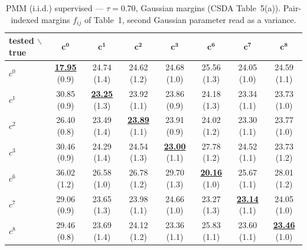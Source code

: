 \begin{table}[htbp]
  \centering
  \small
  \setlength{\tabcolsep}{4pt}
  \caption{PMM (i.i.d.) supervised — $\tau = 0.70$, Gaussian margins (CSDA Table~5(a)). Pair-indexed margins $f_{ij}$ of Table~1, second Gaussian parameter read as a variance.}
  \label{tab:exp2-high_tau_gauss}
  \begin{tabular}{lccccccc}
    \toprule
    tested $\backslash$ true & $\mathbf{c^{0}}$ & $\mathbf{c^{1}}$ & $\mathbf{c^{2}}$ & $\mathbf{c^{3}}$ & $\mathbf{c^{6}}$ & $\mathbf{c^{7}}$ & $\mathbf{c^{8}}$ \\
    \midrule
    $c^{0}$ & \textbf{\underline{17.95}} (0.9) & 24.74 (1.4) & 24.62 (1.2) & 24.68 (1.0) & 25.56 (1.3) & 24.05 (1.0) & 24.59 (1.1) \\
    $c^{1}$ & 30.85 (0.9) & \textbf{\underline{23.25}} (1.3) & 23.92 (1.1) & 23.86 (0.9) & 24.18 (1.3) & 23.34 (1.1) & 23.73 (1.0) \\
    $c^{2}$ & 26.40 (0.8) & 23.49 (1.4) & \textbf{\underline{23.89}} (1.1) & 23.91 (0.9) & 24.02 (1.2) & 23.30 (1.1) & 23.77 (1.0) \\
    $c^{3}$ & 30.46 (0.9) & 24.29 (1.4) & 24.54 (1.3) & \textbf{\underline{23.00}} (1.1) & 27.78 (1.2) & 24.52 (1.1) & 23.73 (1.2) \\
    $c^{6}$ & 36.02 (1.2) & 26.58 (1.0) & 26.78 (1.2) & 29.70 (1.3) & \textbf{\underline{20.16}} (1.0) & 25.67 (1.1) & 28.01 (1.2) \\
    $c^{7}$ & 29.06 (0.9) & 23.65 (1.3) & 23.98 (1.1) & 24.66 (1.0) & 23.27 (1.3) & \textbf{\underline{23.14}} (1.1) & 24.05 (1.0) \\
    $c^{8}$ & 29.46 (0.8) & 23.69 (1.4) & 24.12 (1.2) & 23.36 (1.1) & 25.83 (1.1) & 23.60 (1.1) & \textbf{\underline{23.46}} (1.0) \\
    \bottomrule
  \end{tabular}
\end{table}
